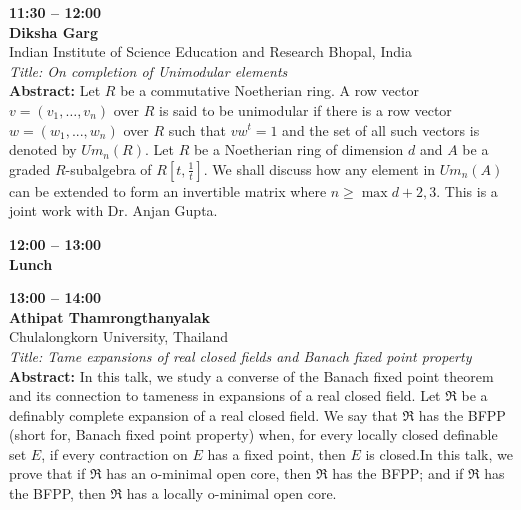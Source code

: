 \documentclass[10pt,a4paper]{article}
\begin{document}
\begin{tcolorbox}[talkbox]
\textbf{11:30 -- 12:00} \\
\textbf{Diksha Garg} \\
Indian Institute of Science Education and Research Bhopal, India \\
\textit{Title: On completion of Unimodular elements} \\
\textbf{Abstract:} Let $R$ be a commutative Noetherian ring. A row vector $v = (v_1, \ldots, v_n)$ over $R$ is said to be unimodular if there is a row vector $w = (w_1, . . . , w_n)$ over $R$ such that $vw^t = 1$ and the set of all such vectors is denoted by $Um_n(R)$. Let $R$ be a Noetherian ring of dimension $d$ and $A$ be a graded $R$-subalgebra of $R\left[t, \frac{1}{t}\right]$. We shall discuss how any element in $Um_n(A)$ can be extended to form an invertible matrix where $n \ge \max{d + 2, 3}$. This is a joint work with Dr. Anjan Gupta.
\end{tcolorbox}
\begin{tcolorbox}[talkbox]
\textbf{12:00 -- 13:00} \\
\textbf{Lunch}
\end{tcolorbox}
\begin{tcolorbox}[talkbox]
\textbf{13:00 -- 14:00} \\
\textbf{Athipat Thamrongthanyalak} \\
Chulalongkorn University, Thailand \\
\textit{Title: Tame expansions of real closed fields and Banach fixed point property} \\
\textbf{Abstract:} In this talk, we study a converse of the Banach fixed point theorem and its connection to tameness in expansions of a real closed field. Let $\mathfrak R$ be a definably complete expansion of a real closed field. We say that $\mathfrak R$ has the BFPP (short for, Banach fixed point property) when, for every locally closed definable set $E$, if every contraction on $E$ has a fixed point, then $E$ is closed.In this talk, we prove that if $\mathfrak R$ has an o-minimal open core, then $\mathfrak R$ has the BFPP; and if $\mathfrak R$ has the BFPP, then $\mathfrak R$ has a locally o-minimal open core.
\end{tcolorbox}
\end{document}
